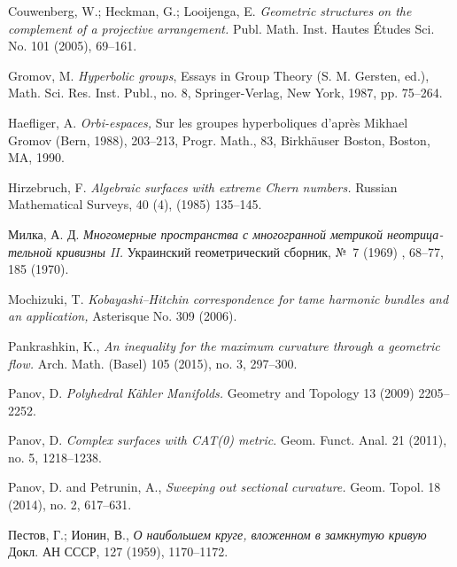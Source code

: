 \documentclass[oneside,a4paper]{article}
\begin{document}
\begin{thebibliography}{52}
Couwenberg, W.; 
Heckman, G.; 
Looijenga, E.
\textit{Geometric structures on the complement of a projective arrangement.}
Publ. Math. Inst. Hautes \'Etudes Sci. No. 101 (2005), 69--161. 

Gromov, M. 
\textit{Hyperbolic groups}, 
Essays in Group Theory (S. M. Gersten, ed.), Math. Sci.
Res. Inst. Publ., no. 8, Springer-Verlag, New York, 1987, pp. 75--264.

Haefliger, A.
\textit{Orbi-espaces,} 
Sur les groupes hyperboliques d'apr\`{e}s Mikhael Gromov (Bern, 1988), 203--213,
Progr. Math., 83, Birk\-h\"auser Boston, Boston, MA, 1990.

Hirzebruch, F. 
\textit{Algebraic surfaces with extreme Chern numbers.}
Russian Mathematical Surveys, 40 (4), (1985) 135--145.

\begin{otherlanguage}{russian}
Милка, А. Д.
\textit{Многомерные пространства с многогранной метрикой неотрицательной кривизны II.}
Украинский геометрический сборник, №~7 (1969) , 68--77, 185 (1970). 
\end{otherlanguage}


Mochizuki, T.
\textit{Kobayashi--Hitchin correspondence for tame
harmonic bundles and an application,} 
Asterisque No. 309
(2006).

Pankrashkin, K., 
\textit{An inequality for the maximum curvature through a geometric flow.} 
Arch. Math. (Basel) 105 (2015), no. 3, 297--300.


Panov, D.
\textit{Polyhedral K\"ahler Manifolds.}
Geometry and Topology 13 (2009) 2205--2252.

Panov, D. 
\textit{Complex surfaces with {\rm CAT(0)} metric}.
Geom. Funct. Anal. 21 (2011), no. 5, 1218--1238.

Panov, D. and Petrunin, A., 
\textit{Sweeping out sectional curvature.}  
Geom. Topol. 18 (2014), no. 2, 617--631.

\begin{otherlanguage}{russian}
Пестов, Г.; Ионин, В.,
\textit{О наибольшем круге, вложенном в замкнутую кривую}
Докл. АН СССР, 127 (1959), 1170--1172.
\end{otherlanguage}


\end{thebibliography}
\end{document}
